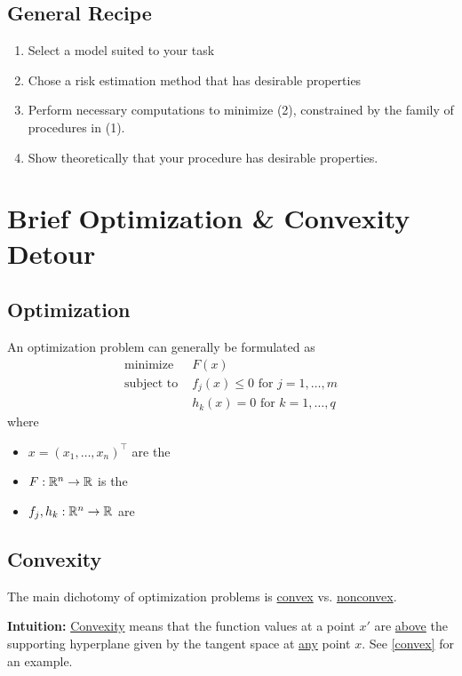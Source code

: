 \documentclass[10pt]{article}
\begin{document}
	\subsection{General Recipe}
		\begin{enumerate}
			\item Select a model suited to your task
			\item Chose a risk estimation method that has desirable properties
			\item Perform necessary computations to minimize (2), constrained by the family of procedures in (1).
			\item Show theoretically that your procedure has desirable properties.
		\end{enumerate}

\section{Brief Optimization \& Convexity Detour}	
	
	\subsection{Optimization}
	An optimization problem can generally be formulated as	
	\begin{align}
	\textrm{minimize } & F(x) \\
	\label{eq:constraint1}
	\textrm{subject to } 
	& f_j(x) \leq 0 \textrm{ for }  j = 1, \ldots, m \\
	\label{eq:constraint2}
	& h_k(x) = 0 \textrm{ for }  k = 1, \ldots, q
	\end{align}
	where
	\begin{itemize}
	\item[] $x = (x_1, \ldots, x_n)^{\top}$ are the 
	\item[] $F:\mathbb{R}^n \rightarrow \mathbb{R}$ is the 
	\item[] $f_j,h_k:\mathbb{R}^n \rightarrow \mathbb{R}$ are 
	\end{itemize}
	
	\subsection{Convexity}
	The main dichotomy of optimization problems is \underline{convex} vs. \underline{nonconvex}.
	
	\textbf{Intuition:} \underline{Convexity} means that the function values at a point $x'$ are \underline{above} the supporting hyperplane given by the tangent space at \underline{any} point $x$. See \autoref{convex} for an example.
	
\end{document}
